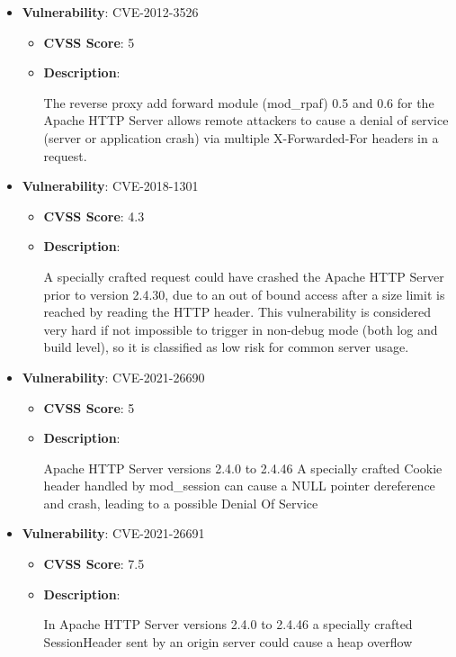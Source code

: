 \documentclass{article}
\begin{document}
\begin{itemize}
        \item \textbf{Vulnerability}: CVE-2012-3526
        \begin{itemize}
            \item \textbf{CVSS Score}:  5 
            \item \textbf{Description}:
            \parbox[t]{0.9\linewidth}{
                \ttfamily The reverse proxy add forward module (mod\_rpaf) 0.5 and 0.6 for the Apache HTTP Server allows remote attackers to cause a denial of service (server or application crash) via multiple X-Forwarded-For headers in a request.
            }
        \end{itemize}
    
        \item \textbf{Vulnerability}: CVE-2018-1301
        \begin{itemize}
            \item \textbf{CVSS Score}:  4.3 
            \item \textbf{Description}:
            \parbox[t]{0.9\linewidth}{
                \ttfamily A specially crafted request could have crashed the Apache HTTP Server prior to version 2.4.30, due to an out of bound access after a size limit is reached by reading the HTTP header. This vulnerability is considered very hard if not impossible to trigger in non-debug mode (both log and build level), so it is classified as low risk for common server usage.
            }
        \end{itemize}
    
        \item \textbf{Vulnerability}: CVE-2021-26690
        \begin{itemize}
            \item \textbf{CVSS Score}:  5 
            \item \textbf{Description}:
            \parbox[t]{0.9\linewidth}{
                \ttfamily Apache HTTP Server versions 2.4.0 to 2.4.46 A specially crafted Cookie header handled by mod\_session can cause a NULL pointer dereference and crash, leading to a possible Denial Of Service
            }
        \end{itemize}
    
        \item \textbf{Vulnerability}: CVE-2021-26691
        \begin{itemize}
            \item \textbf{CVSS Score}:  7.5 
            \item \textbf{Description}:
            \parbox[t]{0.9\linewidth}{
                \ttfamily In Apache HTTP Server versions 2.4.0 to 2.4.46 a specially crafted SessionHeader sent by an origin server could cause a heap overflow
            }
        \end{itemize}
    

\end{itemize}
\end{document}
